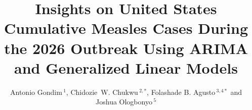 \documentclass[utf8]{FrontiersinHarvard} %
\def\firstAuthorLast{Gondim {et~al.}} %
\def\Authors{Antonio Gondim\,$^{1}$, Chidozie~W. Chukwu\,$^{2,*}$, Folashade B. Agusto\,$^{3,4*}$ and  Joshua Ologbonyo\,$^{5}$ }
\begin{document}
\onecolumn
{}

\title[2026 Measles Outbreak Forecast]{Insights on United States Cumulative Measles Cases During the 2026 Outbreak Using ARIMA and Generalized Linear Models} 

\author[\firstAuthorLast ]{\Authors} %
\address{} %
\correspondance{} %

\extraAuth{}%

\maketitle
\end{document}
